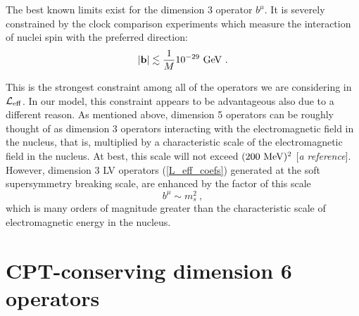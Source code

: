 \documentclass[paper,12pt]{revtex4}
\begin{document}
	The best known limits exist for the dimension 3 operator
	$ b^\mu $.
	It is severely constrained by the clock comparison experiments which
	measure the interaction of nuclei spin with the preferred
	direction:
\begin{equation}
	| {\mathbf b} | \lesssim \frac{1}{M} 10^{-29}~{\rm GeV}
        ~.
\end{equation}

	This is the strongest constraint among all of the operators
	we are considering in $ \mathcal{L}_{\rm eff} $.
	In our model, this constraint appears to be advantageous
	also due to a different reason.
	As mentioned above, dimension 5 operators can be roughly
	thought of as dimension 3 operators interacting with the
	electromagnetic field in the nucleus, that is,
	multiplied by a characteristic scale of the electromagnetic
	field in the nucleus.
	At best, this scale will not exceed $ (200\ {\rm MeV})^2 $
	[{\it a reference}].
	However, dimension 3 LV operators (\ref{L_eff_coefs}) 
	generated at the soft
	supersymmetry breaking scale, are enhanced by the factor
	of this scale
\[
	b^\mu \sim m_s^2~,
\]
	which is many orders of magnitude greater than the characteristic
	scale of electromagnetic energy in the nucleus.
	



\section{CPT-conserving dimension 6 operators}
\label{Dim6}
\end{document}
